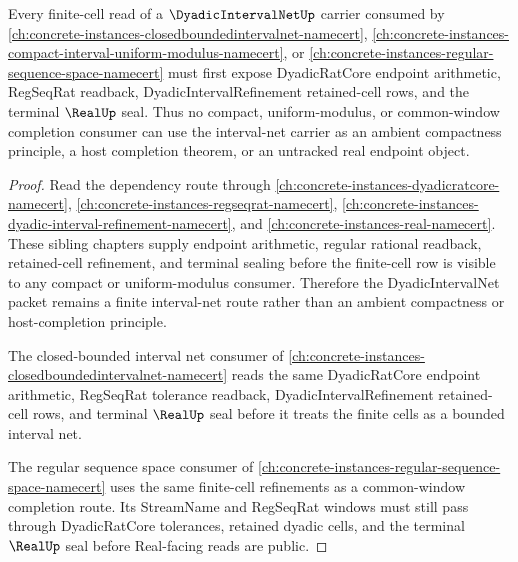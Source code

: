 \begin{theorem}
\label{thm:dyadic-interval-net-orphan-route}
Every finite-cell read of a $\DyadicIntervalNetUp$ carrier consumed by \autoref{ch:concrete-instances-closedboundedintervalnet-namecert}, \autoref{ch:concrete-instances-compact-interval-uniform-modulus-namecert}, or \autoref{ch:concrete-instances-regular-sequence-space-namecert} must first expose DyadicRatCore endpoint arithmetic, RegSeqRat readback, DyadicIntervalRefinement retained-cell rows, and the terminal $\RealUp$ seal. Thus no compact, uniform-modulus, or common-window completion consumer can use the interval-net carrier as an ambient compactness principle, a host completion theorem, or an untracked real endpoint object.
\end{theorem}
\begin{proof}
Read the dependency route through \autoref{ch:concrete-instances-dyadicratcore-namecert}, \autoref{ch:concrete-instances-regseqrat-namecert}, \autoref{ch:concrete-instances-dyadic-interval-refinement-namecert}, and \autoref{ch:concrete-instances-real-namecert}. These sibling chapters supply endpoint arithmetic, regular rational readback, retained-cell refinement, and terminal sealing before the finite-cell row is visible to any compact or uniform-modulus consumer. Therefore the DyadicIntervalNet packet remains a finite interval-net route rather than an ambient compactness or host-completion principle.

The closed-bounded interval net consumer of \autoref{ch:concrete-instances-closedboundedintervalnet-namecert} reads the same DyadicRatCore endpoint arithmetic, RegSeqRat tolerance readback, DyadicIntervalRefinement retained-cell rows, and terminal $\RealUp$ seal before it treats the finite cells as a bounded interval net.

The regular sequence space consumer of \autoref{ch:concrete-instances-regular-sequence-space-namecert} uses the same finite-cell refinements as a common-window completion route. Its StreamName and RegSeqRat windows must still pass through DyadicRatCore tolerances, retained dyadic cells, and the terminal $\RealUp$ seal before Real-facing reads are public.
\end{proof}

